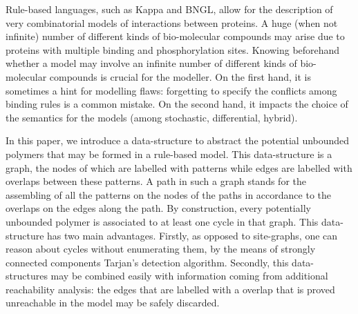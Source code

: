 Rule-based languages, such as Kappa and BNGL, allow for the description of very combinatorial models of interactions between proteins. A huge (when not infinite) number of different kinds of bio-molecular compounds may arise
 due to proteins with multiple binding and phosphorylation sites. Knowing beforehand whether a model may involve an infinite number of different kinds of bio-molecular compounds is crucial for the modeller. On the first hand, it is sometimes a hint for modelling flaws: forgetting to specify
the conflicts among binding rules is a common mistake. On the second hand,
it impacts the choice of  the semantics for the models (among stochastic, differential, hybrid).

In this paper, we introduce a data-structure to abstract the potential unbounded polymers that may be formed in a rule-based model. This data-structure is a graph, the nodes of which are labelled with patterns while edges are labelled with overlaps between these patterns. A path in such a graph stands for the assembling of all the patterns on the nodes of the paths in accordance to the overlaps on the edges along the path. By construction,  every potentially unbounded polymer is associated to at least one cycle in that graph. This data-structure has two main advantages. Firstly, as opposed to site-graphs, one can reason about cycles without enumerating them, by the means of strongly connected components Tarjan's detection algorithm. Secondly, this data-structures may be combined easily with information coming from additional reachability analysis:
the edges that are labelled with a overlap that is proved unreachable in the model may be safely discarded.

